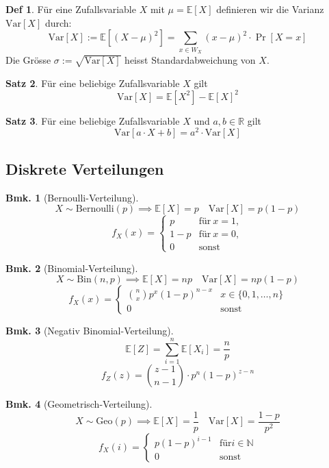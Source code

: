 \documentclass[a4paper, 10pt]{article}
\theoremstyle{definition}
\newtheorem{definition}{Def}[section]
\newtheorem{theorem}[definition]{Satz}
\newtheorem*{note}{Bmk.}
\theoremstyle{named}
\newcommand{\R}{\mathbb{R}}
\newcommand{\N}{\mathbb{N}}
\newcommand{\E}{\mathbb{E}}
\newcommand{\Var}{\text{Var}}
\begin{document}
\setcounter{definition}{38}
\begin{definition}
    Für eine Zufallsvariable $X$ mit $\mu = \E[X]$ definieren wir die Varianz $\Var[X]$ durch:
    $$\Var[X] := \E[(X - \mu)^2] = \sum_{x \in W_X} (x - \mu)^2 \cdot \Pr[X = x]$$
    Die Grösse $\sigma := \sqrt{\Var[X]}$ heisst Standardabweichung von $X$.
\end{definition}

\begin{theorem}
    Für eine beliebige Zufallsvariable $X$ gilt 
    $$\Var[X] = \E[X^2] - \E[X]^2$$
\end{theorem}

\begin{theorem}
    Für eine beliebige Zufallsvariable $X$ und $a, b \in \R$ gilt
    $$\Var[a \cdot X + b] = a^2 \cdot \Var[X]$$
\end{theorem}

\subsection{Diskrete Verteilungen}
\begin{note}[Bernoulli-Verteilung]
    $$X \sim \text{Bernoulli}(p) \implies \E[X] = p \quad \Var[X] = p(1 - p)$$
    $$f_X(x) = \begin{cases}
        p & \text{für} \ x = 1, \\
        1 - p & \text{für} \ x = 0, \\
        0 & \text{sonst}
    \end{cases}$$
\end{note}

\begin{note}[Binomial-Verteilung]
    $$X \sim \text{Bin}(n, p) \implies \E[X] = np \quad \Var[X] = np(1 - p)$$
    $$f_X(x) = \begin{cases}
        \binom{n}{x}p^x(1-p)^{n - x} & x \in \{0, 1, \ldots, n\} \\
        0 & \text{sonst}
    \end{cases}$$
\end{note}

\begin{note}[Negativ Binomial-Verteilung]
    $$\E[Z] = \sum_{i = 1}^n \E[X_i] = \frac{n}{p}$$
    $$f_Z(z) = \binom{z - 1}{n - 1}\cdot p^n(1 - p)^{z - n}$$
\end{note}

\begin{note}[Geometrisch-Verteilung]
    $$X \sim \text{Geo}(p) \implies \E[X] = \frac{1}{p} \quad \Var[X] = \frac{1 - p}{p^2}$$
    $$f_X(i) = \begin{cases}
        p(1-p)^{i - 1} & \text{für} i \in \N \\
        0 & \text{sonst}
    \end{cases}$$
\end{note}
\end{document}

